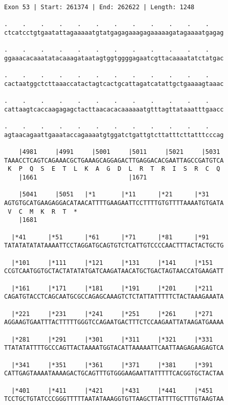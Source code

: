 \documentclass{article}
\begin{document}
\newpage
\begin{Verbatim}
Exon 53 | Start: 261374 | End: 262622 | Length: 1248
 
.    .    .    .    .    .    .    .    .    .    .    .    
ctcatcctgtgaatattagaaaaatgtatgagagaaagagaaaaagatagaaaatgagag
  
.    .    .    .    .    .    .    .    .    .    .    .    
ggaaacacaaatatacaaagataatagtggtggggagaatcgttacaaaatatctatgac
  
.    .    .    .    .    .    .    .    .    .    .    .    
cactaatggctcttaaaccatactagtcactgcattagatcatattgctgaaaagtaaac
  
.    .    .    .    .    .    .    .    .    .    .    .    
cattaagtcaccaagagagctacttaacacacaaaaaatgtttagttataaatttgaacc
  
.    .    .    .    .    .    .    .    .    .    .    .    
agtaacagaattgaaataccagaaaatgtggatctgattgtcttatttcttatttcccag
  
    |4981     |4991     |5001     |5011     |5021     |5031 
TAAACCTCAGTCAGAAACGCTGAAAGCAGGAGACTTGAGGACACGAATTAGCCGATGTCA
 K  P  Q  S  E  T  L  K  A  G  D  L  R  T  R  I  S  R  C  Q 
    |1661                         |1671                     
  
    |5041     |5051   |*1       |*11      |*21      |*31    
AGTGTGCATGAAGAGGACATAACATTTTGAAGAATTCCTTTTGTGTTTTAAAATGTGATA
 V  C  M  K  R  T  *   
    |1681                                                   
  
  |*41      |*51      |*61      |*71      |*81      |*91    
TATATATATATAAAATTCCTAGGATGCAGTGTCTCATTGTCCCCAACTTTACTACTGCTG
  
  |*101     |*111     |*121     |*131     |*141     |*151   
CCGTCAATGGTGCTACTATATATGATCAAGATAACATGCTGACTAGTAACCATGAAGATT
  
  |*161     |*171     |*181     |*191     |*201     |*211   
CAGATGTACCTCAGCAATGCGCCAGAGCAAAGTCTCTATTATTTTTCTACTAAAGAAATA
  
  |*221     |*231     |*241     |*251     |*261     |*271   
AGGAAGTGAATTTACTTTTTGGGTCCAGAATGACTTTCTCCAAGAATTATAAGATGAAAA
  
  |*281     |*291     |*301     |*311     |*321     |*331   
TTATATATTTTGCCCAGTTACTAAAATGGTACATTAAAAATTCAATTAAGAGAAGAGTCA
  
  |*341     |*351     |*361     |*371     |*381     |*391   
CATTGAGTAAAATAAAAGACTGCAGTTTGTGGGAAGAATTATTTTTCACGGTGCTACTAA
  
  |*401     |*411     |*421     |*431     |*441     |*451   
TCCTGCTGTATCCCGGGTTTTTAATATAAAGGTGTTAAGCTTATTTTGCTTTGTAAGTAA
  

\end{Verbatim}
\end{document}
